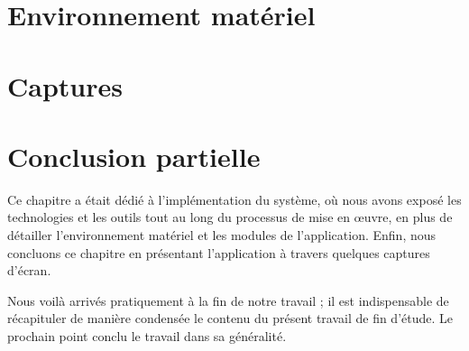     \section[Environnement matériel]{Environnement matériel}
    \section[Captures]{Captures}
    \section[Conclusion partielle]{Conclusion partielle}
    Ce chapitre a était dédié à l’implémentation du système, où nous avons exposé
    les technologies et les outils tout au long du processus de mise en œuvre,
    en plus de détailler l’environnement matériel et les modules de l’application.
    Enfin, nous concluons ce chapitre en présentant l’application à travers quelques
    captures d’écran.
    \par
    Nous voilà arrivés pratiquement à la fin de notre travail ; il est indispensable de récapituler
    de manière condensée le contenu du présent travail de fin d’étude. Le prochain point
    conclu le travail dans sa généralité.